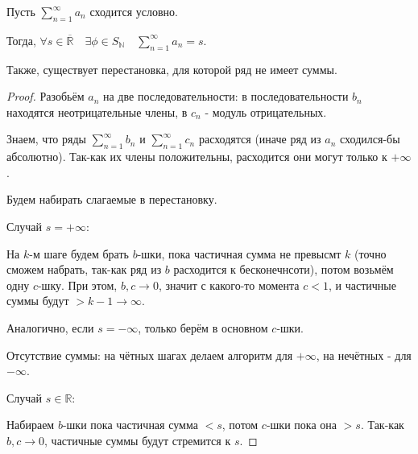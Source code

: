 \begin{theorem} \thmslashn

    Пусть $\sum\limits_{n=1}^{\infty} a_{n}$ сходится условно.

    Тогда, $\forall{s}\in \overline{\mathbb{R}}\quad \exists{\phi\in S_{\mathbb{N}}}\quad \sum\limits_{n=1}^{\infty} a_{n} = s$.

    Также, существует перестановка, для которой ряд не имеет суммы.
    \begin{proof} \thmslashn
    
        Разобьём $a_{n}$ на две последовательности: в последовательности $b_{n}$ находятся неотрицательные члены, в $c_{n}$ - модуль отрицательных.

        Знаем, что ряды $\sum\limits_{n=1}^{\infty} b_{n}$ и $\sum\limits_{n=1}^{\infty} c_{n}$ расходятся (иначе ряд из $a_{n}$ сходился-бы абсолютно). Так-как их члены положительны, расходится они могут только к $+\infty$.

        Будем набирать слагаемые в перестановку. 
        
        Случай $s = +\infty$:

        На $k$-м шаге будем брать $b$-шки, пока частичная сумма не превысмт $k$ (точно сможем набрать, так-как ряд из $b$ расходится к бесконечнсоти), потом возьмём одну $c$-шку. При этом, $b, c \to 0$, значит с какого-то момента $c < 1$, и частичные суммы будут $> k-1 \to \infty$.

        Аналогично, если $s = -\infty$, только берём в основном $c$-шки.

        Отсутствие суммы: на чётных шагах делаем алгоритм для $+\infty$, на нечётных - для $-\infty$.

        Случай $s\in \mathbb{R}$:

        Набираем $b$-шки пока частичная сумма $ <s $, потом $c$-шки пока она $ >s $. Так-как $b, c \to 0$, частичные суммы будут стремится к $s$.
    \end{proof}
\end{theorem}
